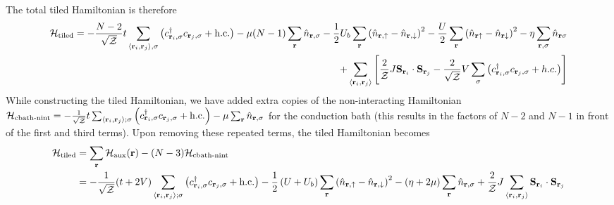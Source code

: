 \documentclass[reprint,hidelinks,onecolumn]{revtex4-2}
\begin{document}
The total tiled Hamiltonian is therefore
\begin{equation}\begin{aligned}
	\mathcal{H}_\text{tiled} = -\frac{N-2}{\sqrt\mathcal{Z}}t\sum_{\left<{\bf r}_i, {\bf r}_j\right>,\sigma}\left(c^\dagger_{{\bf r}_i,\sigma}c_{{\bf r}_j,\sigma} + \text{h.c.}\right) - \mu (N-1) \sum_{{\bf r}}\hat n_{{\bf r},\sigma} - \frac{1}{2}U_b\sum_{\bf r}\left(\hat n_{{\bf r} , \uparrow} - \hat n_{{\bf r} , \downarrow}\right)^2  -\frac{U}{2}\sum_{{\bf r}}\left(\hat n_{{\bf r} \uparrow} - \hat n_{{\bf r} \downarrow} \right)^2 - \eta\sum_{{\bf r},\sigma} \hat n_{{\bf r}\sigma}\\
	+ \sum_{\left< {\bf r}_i, {\bf r}_j\right>}\left[\frac{2}{\mathcal{Z}}J {\bf S}_{{\bf r}_i}\cdot{\bf S}_{{\bf r}_j} - \frac{2}{\sqrt\mathcal{Z}}V \sum_{\sigma}\left(c^\dagger_{{\bf r}_i,\sigma} c_{{{\bf r}_j},\sigma} + h.c.\right)\right]
\end{aligned}\end{equation}
While constructing the tiled Hamiltonian, we have added extra copies of the non-interacting Hamiltonian \(\mathcal{H}_\text{cbath-nint} = -\frac{1}{\sqrt\mathcal{Z}}t\sum_{\left<{\bf r}_i, {\bf r}_j\right>;\sigma}\left(c^\dagger_{{\bf r}_i,\sigma}c_{{\bf r}_j,\sigma} + \text{h.c.}\right) - \mu \sum_{{\bf r}}\hat n_{{\bf r},\sigma}\) for the conduction bath (this results in the factors of \(N-2\) and \(N-1\) in front of the first and third terms). Upon removing these repeated terms, the tiled Hamiltonian becomes
\begin{equation}\begin{aligned}
	\mathcal{H}_\text{tiled} &= \sum_{{\bf r}}\mathcal{H}_\text{aux}({\bf r}) - (N-3)\mathcal{H}_\text{cbath-nint}\\
							 &= -\frac{1}{\sqrt\mathcal{Z}}(t + 2V)\sum_{\left<{\bf r}_i, {\bf r}_j\right>;\sigma}\left(c^\dagger_{{\bf r}_i,\sigma}c_{{\bf r}_j,\sigma} + \text{h.c.}\right) - \frac{1}{2}\left(U + U_b\right)\sum_{\bf r}\left(\hat n_{{\bf r} , \uparrow} - \hat n_{{\bf r} , \downarrow}\right)^2 - \left(\eta + 2\mu\right) \sum_{{\bf r}}\hat n_{{\bf r},\sigma} + \frac{2}{\mathcal{Z}}J\sum_{\left< {\bf r}_i, {\bf r}_j\right>} {\bf S}_{{\bf r}_i}\cdot{\bf S}_{{\bf r}_j}
\end{aligned}\end{equation}
\end{document}
